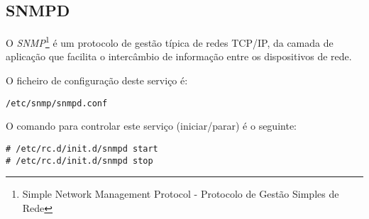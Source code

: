 \subsection{SNMPD}

O \emph{SNMP}\footnote{Simple Network Management Protocol - Protocolo de Gestão Simples de Rede} é um protocolo de gestão típica de redes TCP/IP, da camada de aplicação que facilita o intercâmbio de informação entre os dispositivos de rede.

O ficheiro de configuração deste serviço é:

\begin{Verbatim}[commandchars=\\\{\}]
/etc/snmp/snmpd.conf
\end{Verbatim}

O comando para controlar este serviço (iniciar/parar) é o seguinte:

\begin{Verbatim}[commandchars=\\\{\}]
# /etc/rc.d/init.d/snmpd start
# /etc/rc.d/init.d/snmpd stop
\end{Verbatim}

